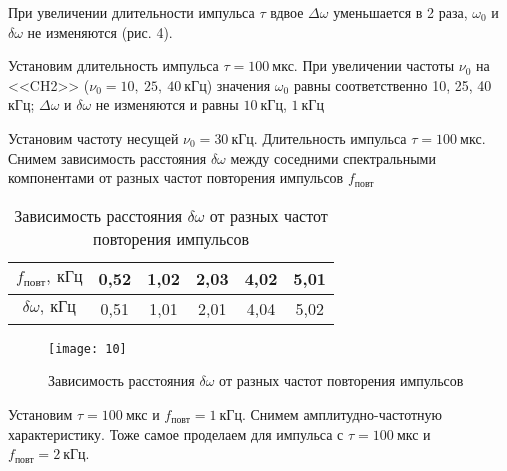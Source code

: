При увеличении длительности импульса $\tau$
вдвое $\Delta \omega$ уменьшается в 2
раза, $\omega_0$ и $\delta \omega$ не
изменяются (рис. 4).

Установим длительность импульса $\tau =
100 \ \text{мкс}$. При увеличении частоты
$\nu_0$
на <<CH2>> ($\nu_0 = 10,\ 25,\ 40 \
\text{кГц}$) значения $\omega_0$ равны
соответственно 10, 25, 40
$\text{кГц}$; $\Delta \omega$ и $\delta \omega$ не
изменяются и равны $10 \ \text{кГц}$, $1 \ \text{кГц}$

Установим частоту несущей $\nu_0 = 30 \
\text{кГц}$. Длительность импульса $\tau
= 100 \ \text{мкс}$. Снимем зависимость
расстояния $\delta \omega$ между
соседними спектральными компонентами от 
разных частот повторения импульсов
$f_\text{повт}$

\begin{table}[H]
    \renewcommand{\arraystretch}{1.2} 
    \begin{tabular}{|c|c|c|c|c|c|}
        \hline
        $f_\text{повт}, \ \text{кГц}$ &
        0,52 & 1,02 & 2,03 & 4,02 & 5,01 \\ \hline
        $\delta \omega, \ \text{кГц}$ &
        0,51 & 1,01 & 2,01 & 4,04 & 5,02 \\ \hline
    \end{tabular}
    \captionsetup{justification=centering}
    \caption{Зависимость расстояния
    $\delta \omega$ от разных частот
повторения импульсов}
\end{table}

\begin{figure}[H]
    \texttt{[image: 10]} 
    \captionsetup{justification=centering}
    \caption{Зависимость расстояния
    $\delta \omega$ от разных частот
повторения импульсов}
\end{figure}

Установим $\tau = 100 \ \text{мкс}$ и
$f_\text{повт} = 1 \ \text{кГц}$. Снимем
амплитудно-частотную характеристику.
Тоже самое проделаем для импульса с
$\tau = 100 \ \text{мкс}$ и
$f_\text{повт} = 2 \ \text{кГц}$.

